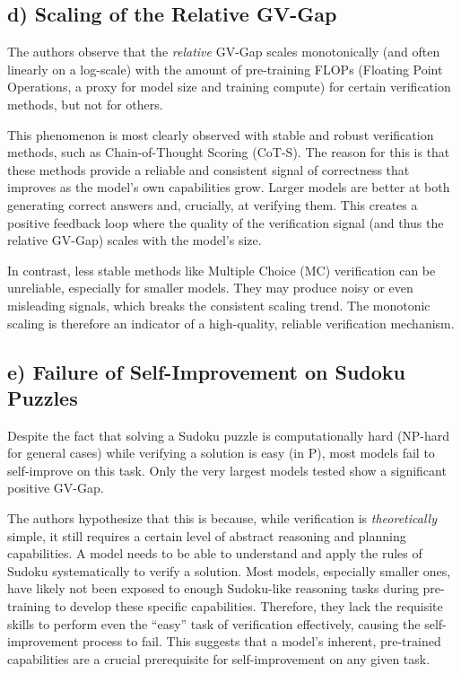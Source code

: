 \documentclass{solutionclass} %
\begin{document}
\subsection{d) Scaling of the Relative GV-Gap}
The authors observe that the \emph{relative} GV-Gap scales monotonically (and often linearly on a log-scale) with the amount of pre-training FLOPs (Floating Point Operations, a proxy for model size and training compute) for certain verification methods, but not for others.

This phenomenon is most clearly observed with stable and robust verification methods, such as Chain-of-Thought Scoring (CoT-S). The reason for this is that these methods provide a reliable and consistent signal of correctness that improves as the model's own capabilities grow. Larger models are better at both generating correct answers and, crucially, at verifying them. This creates a positive feedback loop where the quality of the verification signal (and thus the relative GV-Gap) scales with the model's size.

In contrast, less stable methods like Multiple Choice (MC) verification can be unreliable, especially for smaller models. They may produce noisy or even misleading signals, which breaks the consistent scaling trend. The monotonic scaling is therefore an indicator of a high-quality, reliable verification mechanism.

\subsection{e) Failure of Self-Improvement on Sudoku Puzzles}
Despite the fact that solving a Sudoku puzzle is computationally hard (NP-hard for general cases) while verifying a solution is easy (in P), most models fail to self-improve on this task. Only the very largest models tested show a significant positive GV-Gap.

The authors hypothesize that this is because, while verification is \emph{theoretically} simple, it still requires a certain level of abstract reasoning and planning capabilities. A model needs to be able to understand and apply the rules of Sudoku systematically to verify a solution. Most models, especially smaller ones, have likely not been exposed to enough Sudoku-like reasoning tasks during pre-training to develop these specific capabilities. Therefore, they lack the requisite skills to perform even the ``easy'' task of verification effectively, causing the self-improvement process to fail. This suggests that a model's inherent, pre-trained capabilities are a crucial prerequisite for self-improvement on any given task.
\end{document}
